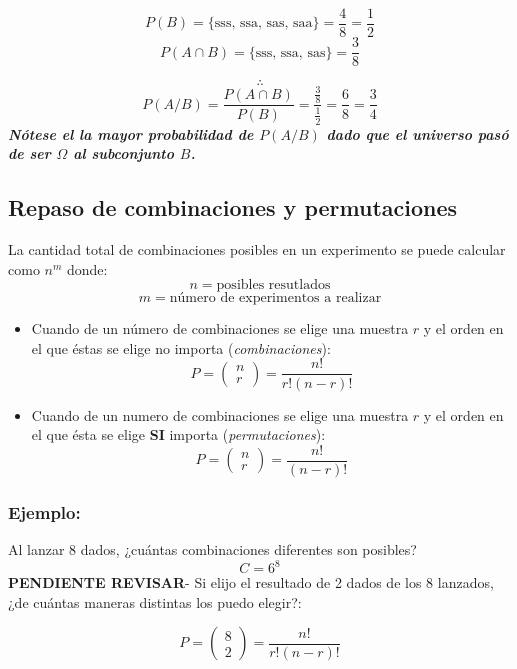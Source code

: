 \documentclass[]{book}
\begin{document}
\[P(B) = \{\text{sss, ssa, sas, saa}\} = \frac{4}{8} = \frac{1}{2}\]
\[P(A\cap B) = \{\text{sss, ssa, sas}\} = \frac{3}{8}\]

\[\therefore\]
\[P(A/B) = \frac {P(A\cap B)}{P(B)} = \frac {\frac {3}{8}}{\frac {1}{2}} = \frac {6}{8} = \frac {3}{4}\]
\textbf{\emph{Nótese el la mayor probabilidad de \(P(A/B)\) dado que el
universo pasó de ser \(\Omega\) al subconjunto \(B\).}}

\subsection{Repaso de combinaciones y
permutaciones}\label{repaso-de-combinaciones-y-permutaciones}

 La cantidad total de combinaciones posibles en un experimento se puede
calcular como \(n^m\) donde: \[n = \text{posibles resutlados}\]
\[m = \text{número de experimentos a realizar}\]

\begin{itemize}
\item
  Cuando de un número de combinaciones se elige una muestra \(r\) y el
  orden en el que éstas se elige no importa (\emph{combinaciones}):
  \[P = \left( \begin{array}{c} n \\ r \end{array} \right) = \frac {n!}{r!(n-r)!}\]
\item
  Cuando de un numero de combinaciones se elige una muestra \(r\) y el
  orden en el que ésta se elige \textbf{SI} importa
  (\emph{permutaciones}):
  \[P = \left( \begin{array}{c} n \\ r \end{array} \right) = \frac {n!}{(n-r)!}\]
\end{itemize}

\subsubsection{Ejemplo:}\label{ejemplo}

Al lanzar 8 dados, ¿cuántas combinaciones diferentes son posibles?
\[C = 6^8\] \textbf{PENDIENTE REVISAR}- Si elijo el resultado de 2 dados
de los 8 lanzados, ¿de cuántas maneras distintas los puedo elegir?:

\[P = \left( \begin{array}{c} 8 \\ 2 \end{array} \right) = \frac {n!}{r!(n-r)!}\]
\end{document}
